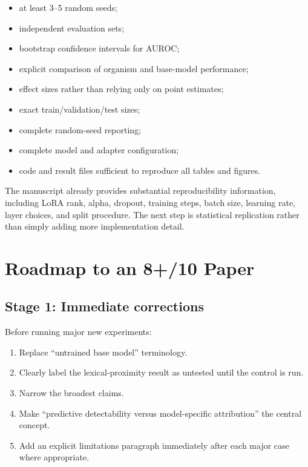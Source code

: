 \documentclass[11pt,a4paper]{article}
\begin{document}
\begin{itemize}
    \item at least 3--5 random seeds;
    \item independent evaluation sets;
    \item bootstrap confidence intervals for AUROC;
    \item explicit comparison of organism and base-model performance;
    \item effect sizes rather than relying only on point estimates;
    \item exact train/validation/test sizes;
    \item complete random-seed reporting;
    \item complete model and adapter configuration;
    \item code and result files sufficient to reproduce all tables and figures.
\end{itemize}

The manuscript already provides substantial reproducibility information, including LoRA rank, alpha, dropout, training steps, batch size, learning rate, layer choices, and split procedure. The next step is statistical replication rather than simply adding more implementation detail.

\section{Roadmap to an 8+/10 Paper}

\subsection{Stage 1: Immediate corrections}

Before running major new experiments:

\begin{enumerate}
    \item Replace ``untrained base model'' terminology.
    \item Clearly label the lexical-proximity result as untested until the control is run.
    \item Narrow the broadest claims.
    \item Make ``predictive detectability versus model-specific attribution'' the central concept.
    \item Add an explicit limitations paragraph immediately after each major case where appropriate.
\end{enumerate}
\end{document}
